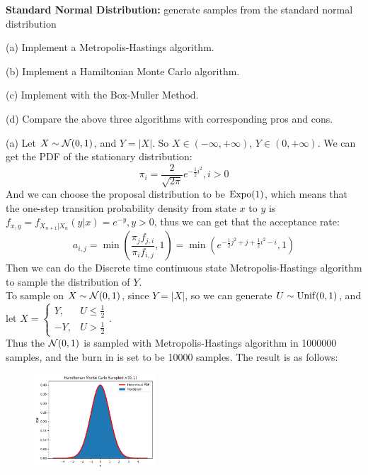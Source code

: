 \begin{homeworkProblem}

\textbf{Standard Normal Distribution:} generate samples from the standard normal distribution

(a) Implement a Metropolis-Hastings algorithm.

(b) Implement a Hamiltonian Monte Carlo algorithm.

(c) Implement with the Box-Muller Method.

(d) Compare the above three algorithms with corresponding pros and cons.

\solution

(a) Let $X\sim \mathcal{N}(0,1)$, and $Y=|X|$. So $X\in (-\infty,+\infty)$, $Y\in (0,+\infty)$. We can get the PDF of the stationary distribution:
$$\pi_i=\dfrac{2}{\sqrt{2\pi}}e^{-\frac{1}{2}i^2},i>0$$
And we can choose the proposal distribution to be $\operatorname{Expo}(1)$, which means that the one-step transition probability density from state $x$ to $y$ is $f_{x,y}=f_{X_{n+1}|X_n}(y|x)=e^{-y},y>0$, thus we can get that the acceptance rate:
$$a_{i,j}=\min\left(\dfrac{\pi_jf_{j,i}}{\pi_if_{i,j}},1\right)=\min\left(e^{-\frac{1}{2}j^2+j+\frac{1}{2}i^2-i},1\right)$$
Then we can do the Discrete time continuous state Metropolis-Hastings algorithm to sample the distribution of $Y$. \\
To sample on $X\sim \mathcal{N}(0,1)$, since $Y=|X|$, so we can generate $U\sim\operatorname{Unif}(0,1)$, and let $X=\begin{cases}
    Y, & U\leq \frac{1}{2} \\
    -Y, & U>\frac{1}{2}
\end{cases}$. \\
Thus the $\mathcal{N}(0,1)$ is sampled with Metropolis-Hastings algorithm in 1000000 samples, and the burn in is set to be 10000 samples. The result is as follows:
\begin{figure}[h]
    \centering
    \includegraphics[width=0.4\textwidth]{./figure/p4/MH.png}
\end{figure}


\end{homeworkProblem}
